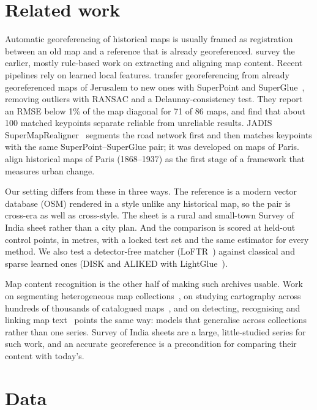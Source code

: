 \documentclass[10pt,twocolumn]{article}
\begin{document}
\section{Related work}
\label{sec:related}
Automatic georeferencing of historical maps is usually framed as registration between an old map and a reference that is already georeferenced. \citet{chiang2014survey} survey the earlier, mostly rule-based work on extracting and aligning map content. Recent pipelines rely on learned local features. \citet{vaienti2025georef} transfer georeferencing from already georeferenced maps of Jerusalem to new ones with SuperPoint and SuperGlue~\citep{detone2018superpoint,sarlin2020superglue}, removing outliers with RANSAC and a Delaunay-consistency test. They report an RMSE below 1\% of the map diagonal for 71 of 86 maps, and find that about 100 matched keypoints separate reliable from unreliable results. JADIS SuperMapRealigner~\citep{petitpierre2026realigner} segments the road network first and then matches keypoints with the same SuperPoint--SuperGlue pair; it was developed on maps of Paris. \citet{wu2026urbanchange} align historical maps of Paris (1868--1937) as the first stage of a framework that measures urban change.

Our setting differs from these in three ways. The reference is a modern vector database (OSM) rendered in a style unlike any historical map, so the pair is cross-era as well as cross-style. The sheet is a rural and small-town Survey of India sheet rather than a city plan. And the comparison is scored at held-out control points, in metres, with a locked test set and the same estimator for every method. We also test a detector-free matcher (LoFTR~\citep{sun2021loftr}) against classical and sparse learned ones (DISK and ALIKED with LightGlue~\citep{tyszkiewicz2020disk,zhao2023aliked,lindenberger2023lightglue}).

Map content recognition is the other half of making such archives usable. Work on segmenting heterogeneous map collections~\citep{petitpierre2026semap}, on studying cartography across hundreds of thousands of catalogued maps~\citep{petitpierre2025thesis}, and on detecting, recognising and linking map text~\citep{lin2025maptext} points the same way: models that generalise across collections rather than one series. Survey of India sheets are a large, little-studied series for such work, and an accurate georeference is a precondition for comparing their content with today's.

\section{Data}
\end{document}
